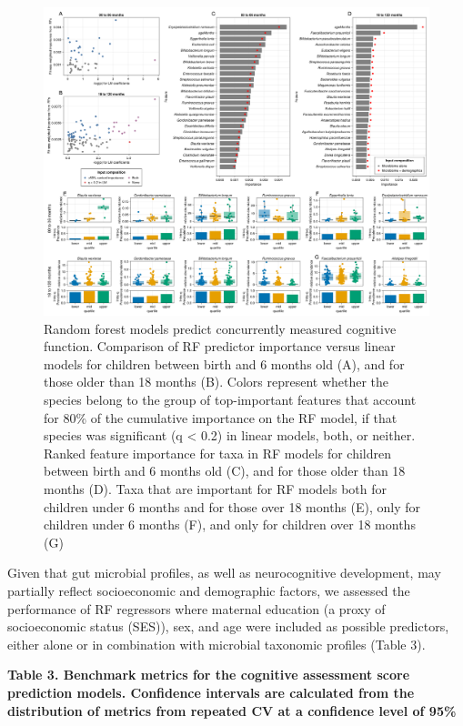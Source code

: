 \documentclass[a4paper]{article}
\begin{document}
\begin{figure}
    \centering
    \includegraphics[width=\textwidth]{assets/Figure3.png}
    \caption{
        Random forest models predict concurrently measured cognitive function.
        Comparison of RF predictor importance versus linear models for children
        between birth and 6 months old (A), and for those older than 18 months
        (B). Colors represent whether the species belong to the group of
        top-important features that account for 80\% of the cumulative
        importance on the RF model, if that species was significant (q
        \textless{} 0.2) in linear models, both, or neither. Ranked feature
        importance for taxa in RF models for children between birth and 6 months
        old (C), and for those older than 18 months (D). Taxa that are important
        for RF models both for children under 6 months and for those over 18
        months (E), only for children under 6 months (F), and only for children
        over 18 months (G)
    }
    \label{fig:Figure 3}
\end{figure}


Given that gut microbial profiles, as well as neurocognitive
development, may partially reflect socioeconomic and demographic
factors, we assessed the performance of RF regressors where maternal
education (a proxy of socioeconomic status (SES)), sex, and age were
included as possible predictors, either alone or in combination with
microbial taxonomic profiles (Table 3).

\textbf{Table 3. Benchmark metrics for the cognitive assessment score
prediction models. Confidence intervals are calculated from the
distribution of metrics from repeated CV at a confidence level of 95\%}
\end{document}
